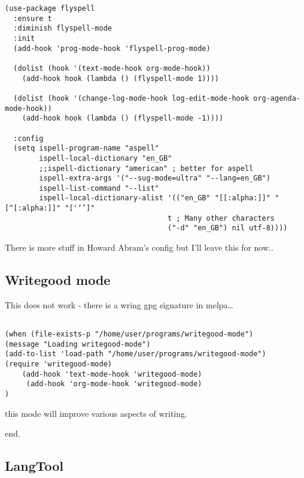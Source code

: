 \documentclass[12pt]{article}
\begin{document}
\lstset{language=Lisp,label= ,caption= ,captionpos=b,numbers=none}
\begin{lstlisting}
(use-package flyspell
  :ensure t
  :diminish flyspell-mode
  :init
  (add-hook 'prog-mode-hook 'flyspell-prog-mode)

  (dolist (hook '(text-mode-hook org-mode-hook))
    (add-hook hook (lambda () (flyspell-mode 1))))

  (dolist (hook '(change-log-mode-hook log-edit-mode-hook org-agenda-mode-hook))
    (add-hook hook (lambda () (flyspell-mode -1))))

  :config
  (setq ispell-program-name "aspell"
        ispell-local-dictionary "en_GB"
        ;;ispell-dictionary "american" ; better for aspell
        ispell-extra-args '("--sug-mode=ultra" "--lang=en_GB")
        ispell-list-command "--list"
        ispell-local-dictionary-alist '(("en_GB" "[[:alpha:]]" "[^[:alpha:]]" "['‘’]"
                                      t ; Many other characters
                                      ("-d" "en_GB") nil utf-8))))

\end{lstlisting}

There is more stuff in Howard Abram's config but I'll leave this for now..



\subsection{Writegood mode}
\label{sec:org184fd38}
This does not work - there is a wring gpg signature in melpa\ldots{} 

\lstset{language=Lisp,label= ,caption= ,captionpos=b,numbers=none}
\begin{lstlisting}

(when (file-exists-p "/home/user/programs/writegood-mode")
(message "Loading writegood-mode")
(add-to-list 'load-path "/home/user/programs/writegood-mode")
(require 'writegood-mode)
    (add-hook 'text-mode-hook 'writegood-mode)
     (add-hook 'org-mode-hook 'writegood-mode)
)
\end{lstlisting}

this mode will improve various aspects of writing. 

end.


\subsection{LangTool}
\label{sec:org1d14d48}
\end{document}
